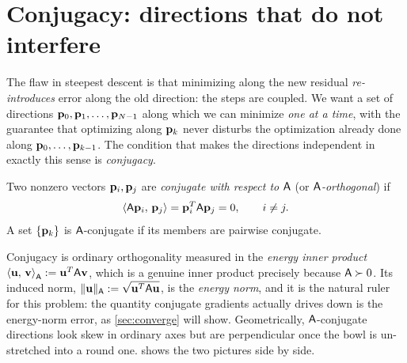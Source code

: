 \section{Conjugacy: directions that do not interfere}
\label{sec:conjugacy}

The flaw in steepest descent is that minimizing along the new residual
\emph{re-introduces} error along the old direction: the steps are coupled. We
want a set of directions $\mathbf{p}_0,\mathbf{p}_1,\dots,\mathbf{p}_{N-1}$ along which we can minimize
\emph{one at a time}, with the guarantee that optimizing along $\mathbf{p}_k$ never
disturbs the optimization already done along $\mathbf{p}_0,\dots,\mathbf{p}_{k-1}$. The
condition that makes the directions independent in exactly this sense is
\emph{conjugacy}.

\begin{definition}
\label{def:conjugate}
Two nonzero vectors $\mathbf{p}_i,\mathbf{p}_j$ are \emph{conjugate with respect to $\mathsf{A}$}
(or \emph{$\mathsf{A}$-orthogonal}) if
\[
  \left\langle \mathsf{A}\mathbf{p}_i,\, \mathbf{p}_j\right\rangle = \mathbf{p}_i^{T}\mathsf{A}\mathbf{p}_j = 0,\qquad i\neq j .
\]
A set $\{\mathbf{p}_k\}$ is $\mathsf{A}$-conjugate if its members are pairwise conjugate.
\end{definition}

Conjugacy is ordinary orthogonality measured in the \emph{energy inner product}
$\left\langle \mathbf{u},\, \mathbf{v}\right\rangle_{\mathsf{A}}:=\mathbf{u}^{T}\mathsf{A}\mathbf{v}$, which is a genuine inner product
precisely because $\mathsf{A}\succ0$. Its induced norm,
$\lVert\mathbf{u}\rVert_{\mathsf{A}}:=\sqrt{\mathbf{u}^{T}\mathsf{A}\mathbf{u}}$, is the \emph{energy norm}, and
it is the natural ruler for this problem: the quantity conjugate gradients
actually drives down is the energy-norm error, as \cref{sec:converge} will show.
Geometrically, $\mathsf{A}$-conjugate directions look skew in ordinary axes but are
perpendicular once the bowl is un-stretched into a round one. 
shows the two pictures side by side.

